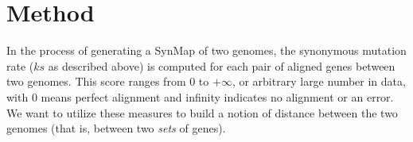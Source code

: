 \documentclass{vgtc}                      %
\begin{document}




\section{Method}
In the process of generating a SynMap of two genomes, the synonymous mutation rate ($ks$ as described above) is computed for each pair of aligned genes between two genomes. This score ranges from $0$ to $+\infty$, or arbitrary large number in data, with $0$ means perfect alignment and infinity indicates no alignment or an error.
We want to utilize these measures to build a notion of distance between the two genomes (that is, between two \emph{sets} of genes).
\end{document}
